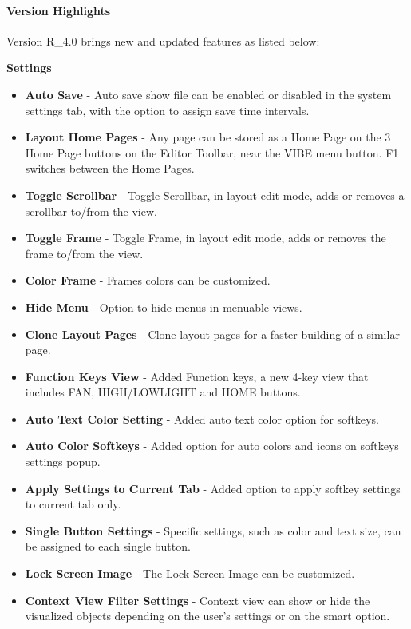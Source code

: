 \documentclass[
]{article}
\begin{document}
\hypertarget{version-highlights-3}{%
\paragraph{Version Highlights}\label{version-highlights-3}}

Version R\_4.0 brings new and updated features as listed below:

\textbf{Settings}

\begin{itemize}
\item
  \textbf{Auto Save} - Auto save show file can be enabled or disabled in the system settings tab, with the option to assign save time intervals.
\item
  \textbf{Layout Home Pages} - Any page can be stored as a Home Page on the 3 Home Page buttons on the Editor Toolbar, near the VIBE menu button. F1 switches between the Home Pages.
\item
  \textbf{Toggle Scrollbar} - Toggle Scrollbar, in layout edit mode, adds or removes a scrollbar to/from the view.
\item
  \textbf{Toggle Frame} - Toggle Frame, in layout edit mode, adds or removes the frame to/from the view.
\item
  \textbf{Color Frame} - Frames colors can be customized.
\item
  \textbf{Hide Menu} - Option to hide menus in menuable views.
\item
  \textbf{Clone Layout Pages} - Clone layout pages for a faster building of a similar page.
\item
  \textbf{Function Keys View} - Added Function keys, a new 4-key view that includes FAN, HIGH/LOWLIGHT and HOME buttons.
\item
  \textbf{Auto Text Color Setting} - Added auto text color option for softkeys.
\item
  \textbf{Auto Color Softkeys} - Added option for auto colors and icons on softkeys settings popup.
\item
  \textbf{Apply Settings to Current Tab} - Added option to apply softkey settings to current tab only.
\item
  \textbf{Single Button Settings} - Specific settings, such as color and text size, can be assigned to each single button.
\item
  \textbf{Lock Screen Image} - The Lock Screen Image can be customized.
\item
  \textbf{Context View Filter Settings} - Context view can show or hide the visualized objects depending on the user's settings or on the smart option.
\end{itemize}
\end{document}
